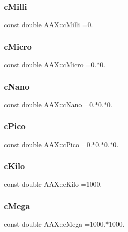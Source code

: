 \subsubsection{\texorpdfstring{cMilli}{cMilli}}
{\footnotesize\ttfamily const double A\+A\+X\+::c\+Milli =0.}

\mbox{\label{a00852_a661c2b5af007244eb8ffcefdae2608d0}} 
\subsubsection{\texorpdfstring{cMicro}{cMicro}}
{\footnotesize\ttfamily const double A\+A\+X\+::c\+Micro =0.$\ast$0.}

\mbox{\label{a00852_a3227cf335c40f4afcc72efd8f774ac92}} 
\subsubsection{\texorpdfstring{cNano}{cNano}}
{\footnotesize\ttfamily const double A\+A\+X\+::c\+Nano =0.$\ast$0.$\ast$0.}

\mbox{\label{a00852_a480023c4a430fed889626b81c66d7589}} 
\subsubsection{\texorpdfstring{cPico}{cPico}}
{\footnotesize\ttfamily const double A\+A\+X\+::c\+Pico =0.$\ast$0.$\ast$0.$\ast$0.}

\mbox{\label{a00852_aa151b1429ed5eabb4000d1b13e47a5c2}} 
\subsubsection{\texorpdfstring{cKilo}{cKilo}}
{\footnotesize\ttfamily const double A\+A\+X\+::c\+Kilo =1000.}

\mbox{\label{a00852_ad20650c749492b31ef48b41ac84f57e9}} 
\subsubsection{\texorpdfstring{cMega}{cMega}}
{\footnotesize\ttfamily const double A\+A\+X\+::c\+Mega =1000.$\ast$1000.}

